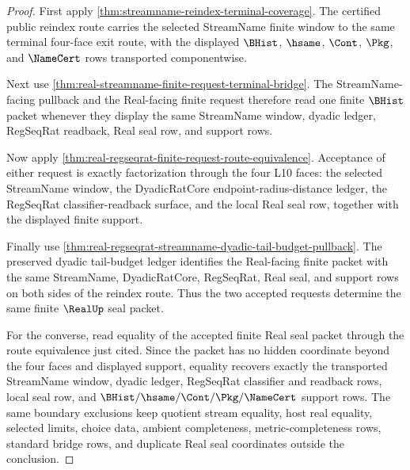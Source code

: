 \begin{proof}
First apply \autoref{thm:streamname-reindex-terminal-coverage}. The certified public reindex route carries the selected StreamName finite window to the same terminal four-face exit route, with the displayed $\BHist$, $\hsame$, $\Cont$, $\Pkg$, and $\NameCert$ rows transported componentwise.

Next use \autoref{thm:real-streamname-finite-request-terminal-bridge}. The StreamName-facing pullback and the Real-facing finite request therefore read one finite $\BHist$ packet whenever they display the same StreamName window, dyadic ledger, RegSeqRat readback, Real seal row, and support rows.

Now apply \autoref{thm:real-regseqrat-finite-request-route-equivalence}. Acceptance of either request is exactly factorization through the four L10 faces: the selected StreamName window, the DyadicRatCore endpoint-radius-distance ledger, the RegSeqRat classifier-readback surface, and the local Real seal row, together with the displayed finite support.

Finally use \autoref{thm:real-regseqrat-streamname-dyadic-tail-budget-pullback}. The preserved dyadic tail-budget ledger identifies the Real-facing finite packet with the same StreamName, DyadicRatCore, RegSeqRat, Real seal, and support rows on both sides of the reindex route. Thus the two accepted requests determine the same finite $\RealUp$ seal packet.

For the converse, read equality of the accepted finite Real seal packet through the route equivalence just cited. Since the packet has no hidden coordinate beyond the four faces and displayed support, equality recovers exactly the transported StreamName window, dyadic ledger, RegSeqRat classifier and readback rows, local seal row, and $\BHist/\hsame/\Cont/\Pkg/\NameCert$ support rows. The same boundary exclusions keep quotient stream equality, host real equality, selected limits, choice data, ambient completeness, metric-completeness rows, standard bridge rows, and duplicate Real seal coordinates outside the conclusion.
\end{proof}

